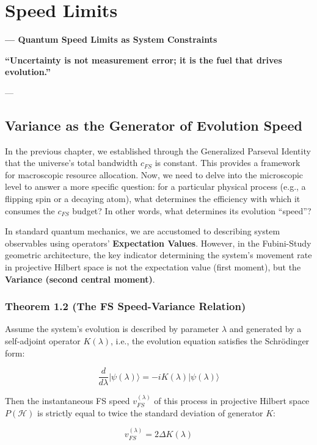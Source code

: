 \documentclass[11pt,a4paper,twoside]{book}
\begin{document}
 \section{Speed Limits}

\textbf{--- Quantum Speed Limits as System Constraints}

\textbf{``Uncertainty is not measurement error; it is the fuel that drives evolution.''}

---

\subsection{Variance as the Generator of Evolution Speed}

In the previous chapter, we established through the Generalized Parseval Identity that the universe's total bandwidth \textbf{$c_{FS}$} is constant. This provides a framework for macroscopic resource allocation. Now, we need to delve into the microscopic level to answer a more specific question: for a particular physical process (e.g., a flipping spin or a decaying atom), what determines the efficiency with which it consumes the \textbf{$c_{FS}$} budget? In other words, what determines its evolution ``speed''?

In standard quantum mechanics, we are accustomed to describing system observables using operators' \textbf{Expectation Values}. However, in the Fubini-Study geometric architecture, the key indicator determining the system's movement rate in projective Hilbert space is not the expectation value (first moment), but the \textbf{Variance (second central moment)}.

\subsubsection{Theorem 1.2 (The FS Speed-Variance Relation)}

Assume the system's evolution is described by parameter \textbf{$\lambda$} and generated by a self-adjoint operator \textbf{$K(\lambda)$}, i.e., the evolution equation satisfies the Schrödinger form:

$$\frac{d}{d\lambda}|\psi(\lambda)\rangle = -i K(\lambda)|\psi(\lambda)\rangle$$

Then the instantaneous FS speed \textbf{$v_{FS}^{(\lambda)}$} of this process in projective Hilbert space \textbf{$P(\mathcal{H})$} is strictly equal to twice the standard deviation of generator \textbf{$K$}:

$$v_{FS}^{(\lambda)} = 2\Delta K(\lambda)$$
\end{document}
